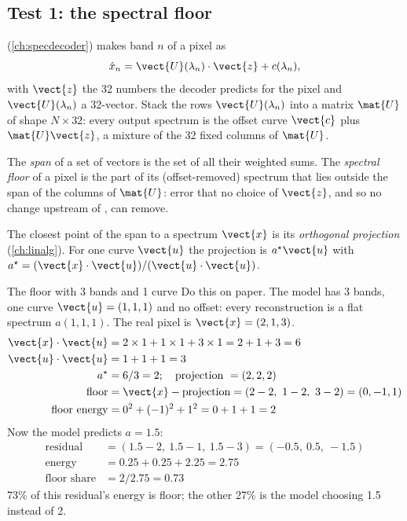 \subsection{Test 1: the spectral floor}\label{sec:decoderwork:floor}

 (\cref{ch:specdecoder}) makes band $n$ of a pixel as
\begin{equation}\label{eq:decoderwork:wld}
\hat x_n = \vect{U}(\lambda_n)\cdot\vect{z} + c(\lambda_n),
\end{equation}
with $\vect{z}$ the 32 numbers the decoder predicts for the pixel and $\vect{U}(\lambda_n)$ a 32-vector. Stack
the rows $\vect{U}(\lambda_n)$ into a matrix $\mat{U}$ of shape $N\times32$: every output spectrum is the offset
curve $\vect{c}$ plus $\mat{U}\vect{z}$, a mixture of the 32 fixed columns of $\mat{U}$.

\begin{definition}
The \emph{span} of a set of vectors is the set of all their weighted sums. The \emph{spectral
floor} of a pixel is the part of its (offset-removed) spectrum that lies outside the span of
the columns of $\mat{U}$: error that no choice of $\vect{z}$, and so no change upstream of ,
can remove.
\end{definition}

The closest point of the span to a spectrum $\vect{x}$ is its \emph{orthogonal projection}
(\cref{ch:linalg}). For one curve $\vect{u}$ the projection is $a^\star\vect{u}$ with
$a^\star=(\vect{x}\cdot\vect{u})/(\vect{u}\cdot\vect{u})$.

\begin{worked}[label={we:decoderwork:floor}]{The floor with 3 bands and 1 curve}
Do this on paper. The model has 3 bands, one curve $\vect{u}=(1,1,1)$ and no offset: every reconstruction is a
flat spectrum $a(1,1,1)$. The real pixel is $\vect{x}=(2,1,3)$.
\begin{align*}
\vect{x}\cdot\vect{u} &= 2\times1+1\times1+3\times1 = 2+1+3 = 6\\
\vect{u}\cdot\vect{u} &= 1+1+1 = 3\\
a^\star &= 6/3 = 2;\quad\text{projection } = (2,2,2)\\
\text{floor} &= \vect{x}-\text{projection} = (2-2,\ 1-2,\ 3-2) = (0,-1,1)\\
\text{floor energy} &= 0^2+(-1)^2+1^2 = 0+1+1 = 2
\end{align*}
Now the model predicts $a=1.5$:
\begin{align*}
\text{residual} &= (1.5-2,\ 1.5-1,\ 1.5-3) = (-0.5,\ 0.5,\ -1.5)\\
\text{energy} &= 0.25+0.25+2.25 = 2.75\\
\text{floor share} &= 2/2.75 = 0.73
\end{align*}
73\% of this residual's energy is floor; the other 27\% is the model choosing 1.5 instead of 2.
\end{worked}

